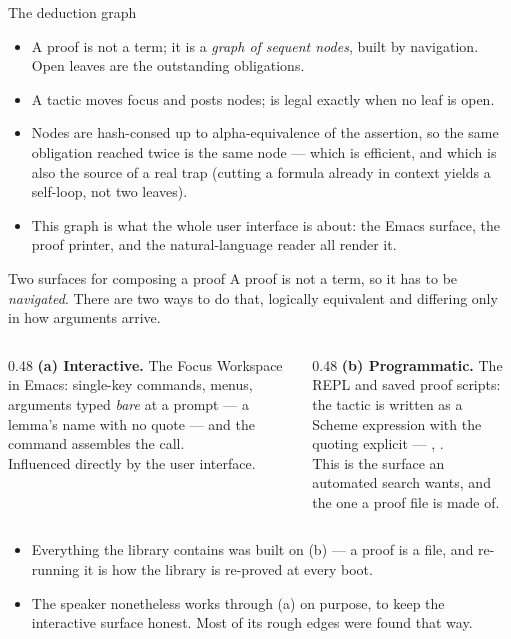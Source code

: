 \documentclass[11pt,aspectratio=169]{beamer}
\begin{document}
\begin{frame}{The deduction graph}
  \begin{itemize}
    \item A proof is not a term; it is a \emph{graph of sequent nodes}, built
          by navigation. Open leaves are the outstanding obligations.
    \item A tactic moves focus and posts nodes;  is legal exactly
          when no leaf is open.
    \item Nodes are hash-consed up to alpha-equivalence of the assertion, so
          the same obligation reached twice is the same node --- which is
          efficient, and which is also the source of a real trap (cutting a
          formula already in context yields a self-loop, not two leaves).
    \item This graph is what the whole user interface is about: the Emacs
          surface, the proof printer, and the natural-language reader all
          render it.
  \end{itemize}
\end{frame}

\begin{frame}{Two surfaces for composing a proof}
  A proof is not a term, so it has to be \emph{navigated}. There are two ways
  to do that, logically equivalent and differing only in how arguments arrive.
  \begin{columns}[T]
    \begin{column}{0.48\textwidth}
      \textbf{(a) Interactive.} The Focus Workspace in Emacs: single-key
      commands, menus, arguments typed \emph{bare} at a prompt --- a lemma's
      name with no quote --- and the command assembles the call.
      \vspace{1ex}\\
      Influenced directly by the \imps{} user interface.
    \end{column}
    \begin{column}{0.48\textwidth}
      \textbf{(b) Programmatic.} The REPL and saved proof scripts: the tactic
      is written as a Scheme expression with the quoting explicit ---
      , .
      \vspace{1ex}\\
      This is the surface an automated search wants, and the one a proof file
      is made of.
    \end{column}
  \end{columns}
  \vfill
  \begin{itemize}
    \item Everything the library contains was built on (b) --- a proof is a
          file, and re-running it is how the library is re-proved at every
          boot.
    \item The speaker nonetheless works through (a) on purpose, to keep the
          interactive surface honest. Most of its rough edges were found that
          way.
  \end{itemize}
\end{frame}
\end{document}
